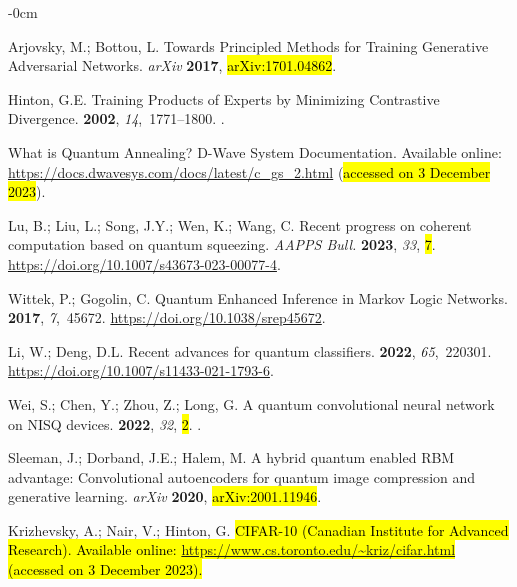\documentclass[technologies,article,accept,pdftex,moreauthors]{Definitions/mdpi}
\begin{document}
\begin{adjustwidth}{-\extralength}{0cm}
\begin{thebibliography}{999}
Arjovsky, M.; Bottou, L. Towards Principled Methods for Training Generative Adversarial Networks. \emph{arXiv} \textbf{2017},  \hl{arXiv:1701.04862}.
 

Hinton, G.E.
\newblock Training Products of Experts by Minimizing Contrastive Divergence.
 {\bf 2002}, {\em 14},~1771--1800.
.

{W}hat is {Q}uantum {A}nnealing? {D}-{W}ave {S}ystem {D}ocumentation.
 Available online: \url{https://docs.dwavesys.com/docs/latest/c_gs_2.html} (\hl{accessed on 3 December 2023}). 

Lu, B.; Liu, L.; Song, J.Y.; Wen, K.; Wang, C.
\newblock Recent progress on coherent computation based on quantum squeezing. {\em {AAPPS} Bull.} {\bf 2023}, {\em 33}, \hl{7}. {\url{https://doi.org/10.1007/s43673-023-00077-4}}. %

Wittek, P.; Gogolin, C.
\newblock Quantum Enhanced Inference in Markov Logic Networks.
 {\bf 2017}, {\em 7},~45672. {\url{https://doi.org/10.1038/srep45672}}.

Li, W.; Deng, D.L.
\newblock Recent advances for quantum classifiers.
 {\bf 2022}, {\em
  65},~220301.  {\url{https://doi.org/10.1007/s11433-021-1793-6}}.

Wei, S.; Chen, Y.; Zhou, Z.; Long, G.
\newblock A quantum convolutional neural network on NISQ devices.
 {\bf 2022}, {\em 32}, \hl{2}.
.

Sleeman, J.; Dorband, J.E.; Halem, M.
\newblock A hybrid quantum enabled RBM advantage: Convolutional autoencoders
  for quantum image compression and generative learning. \emph{arXiv} \textbf{2020},  \hl{arXiv:2001.11946}. %

Krizhevsky, A.; Nair, V.; Hinton, G.
\newblock \hl{CIFAR-10 (Canadian Institute for Advanced Research). Available online: \url{https://www.cs.toronto.edu/~kriz/cifar.html} (\hl{accessed on 3 December 2023}).
}%


\end{thebibliography}
\end{adjustwidth}
\end{document}
